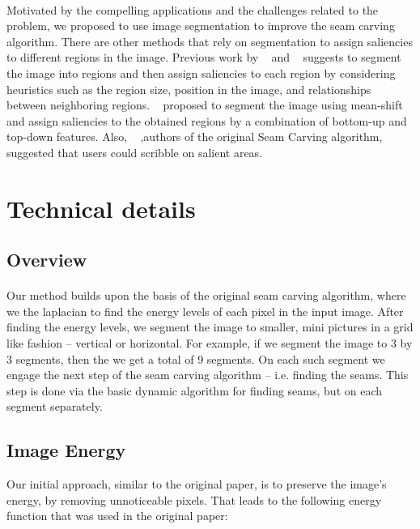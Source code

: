 \documentclass[conference]{acmsiggraph}
\begin{document}
\paragraph{}
Motivated by the compelling applications and the challenges related to the problem, we proposed to use image segmentation to improve the seam carving algorithm. There are other methods that rely on segmentation to assign saliencies to different regions in the image. Previous work by ~\cite{Liu2007} and ~\cite{Hasan2009} suggests to segment the image into regions and then assign saliencies to each region by considering heuristics such as the region size, position in the image, and relationships between neighboring regions. ~\cite{Setlur2005} proposed to segment the image using mean-shift and assign saliencies to the obtained regions by a combination of bottom-up and top-down features. Also, ~\cite{Avidan2007} ,authors of the original Seam Carving algorithm, suggested that users could scribble on salient areas. 

\section{Technical details}

\subsection{Overview}

\paragraph{}
Our method builds upon the basis of the original seam carving algorithm, where we the laplacian to find the energy levels of each pixel in the input image. After finding the energy levels, we segment the image to smaller, mini pictures in a grid like fashion -- vertical or horizontal. For example, if we segment the image to 3 by 3 segments, then the we get a total of 9 segments. On each such segment we engage the next step of the seam carving algorithm -- i.e. finding the seams. This step is done via the basic dynamic algorithm for finding seams, but on each segment separately.

\subsection{Image Energy}
Our initial approach, similar to the original paper, is to preserve the image's energy, by removing unnoticeable pixels. That leads to the following energy function that was used in the original paper:
\end{document}
